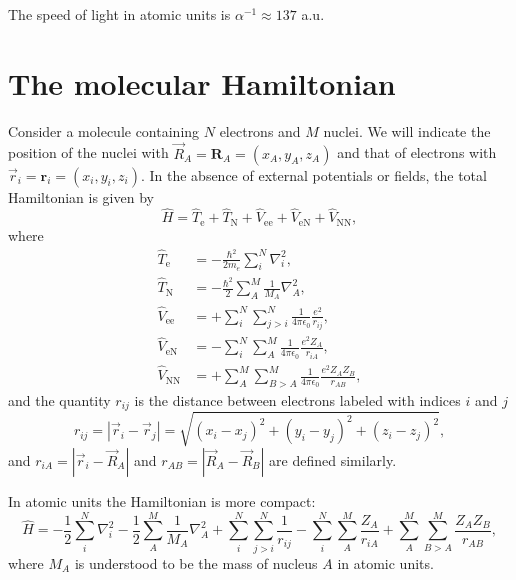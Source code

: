 \documentclass[../Main/chem532-notes.tex]{subfiles}
\begin{document}
The speed of light in atomic units is $\alpha^{-1}\approx 137$ a.u.


\section{The molecular Hamiltonian}
Consider a molecule containing $N$ electrons and $M$ nuclei.
We will indicate the position of the nuclei with $\vec{R}_A = \mathbf{R}_A = (x_A,y_A,z_A)$ and that of electrons with $\vec{r}_i = \mathbf{r}_i = (x_i,y_i,z_i)$.
In the absence of external potentials or fields, the total Hamiltonian is given by
\begin{equation}
\hat{H} = \hat{T}_\mathrm{e} +\hat{T}_\mathrm{N} +  \hat{V}_\mathrm{ee} + \hat{V}_\mathrm{eN} + \hat{V}_\mathrm{NN},
\end{equation}
where
\begin{align}
\hat{T}_\mathrm{e} &= -\frac{\hbar^2}{2 m_e} \sum_i^N \nabla^2_i, \\
\hat{T}_\mathrm{N} &= -\frac{\hbar^2}{2} \sum_A^M \frac{1}{M_A} \nabla^2_A, \\
\hat{V}_\mathrm{ee} &= +\sum_{i}^{N}\sum_{j > i}^{N} \frac{1}{4 \pi \epsilon_0} \frac{e^2}{r_{ij}},\\
\hat{V}_\mathrm{eN} &= - \sum_{i}^{N} \sum_{A}^{M} \frac{1}{4 \pi \epsilon_0} \frac{e^2 Z_A}{r_{iA}}, \\
\hat{V}_\mathrm{NN} &= +\sum_{A}^{M} \sum_{B > A}^{M} \frac{1}{4 \pi \epsilon_0} \frac{e^2 Z_A Z_B}{r_{AB}},
\end{align}
and the quantity $r_{ij}$ is the distance between electrons labeled with indices $i$ and $j$
\begin{equation}
r_{ij} = |\vec{r}_i - \vec{r}_j| = \sqrt{(x_i-x_j)^2 + (y_i-y_j)^2 + (z_i-z_j)^2},
\end{equation}
and $r_{iA} = |\vec{r}_i - \vec{R}_A|$ and $r_{AB} = |\vec{R}_A - \vec{R}_B|$ are defined similarly.

In atomic units the Hamiltonian is more compact:
\begin{equation}
\label{eq:molecular_hamiltonian}
\hat{H} =
-\frac{1}{2} \sum_i^N \nabla^2_i
-\frac{1}{2} \sum_A^M \frac{1}{M_A} \nabla^2_A
+ \sum_{i}^{N}\sum_{j > i}^{N} \frac{1}{r_{ij}}
- \sum_{i}^{N} \sum_{A}^{M} \frac{Z_A}{r_{iA}}
+ \sum_{A}^{M} \sum_{B > A}^{M} \frac{Z_A Z_B}{r_{AB}},
\end{equation}
where $M_A$ is understood to be the mass of nucleus $A$ in atomic units.
\end{document}
